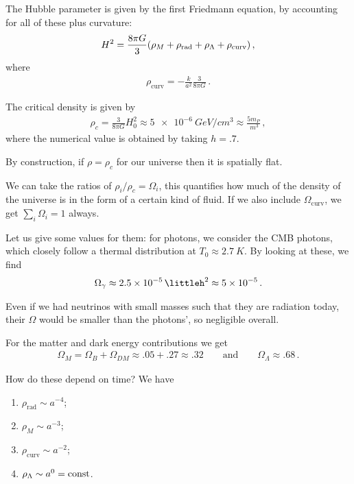 \documentclass[main.tex]{subfiles}
\begin{document}
The Hubble parameter is given by the first Friedmann equation, by accounting for all of these plus curvature:
%
\begin{align}
H^2 = \frac{8 \pi G}{3} \qty(\rho_{M} + \rho _{\text{rad}} + \rho_{\Lambda } + \rho _{\text{curv}})
\,,
\end{align}
%
where 
%
\begin{align}
\rho _{\text{curv}} = - \frac{k}{a^2} \frac{3}{8 \pi G}
\,.
\end{align}

The critical density is given by 
%
\begin{align}
\rho_{c} = \frac{3}{8 \pi G} H_0^2 \approx \SI{5e-6}{GeV / cm^3} \approx \frac{5 m_P}{\SI{}{m^3}}
\,,
\end{align}
%
where the numerical value is obtained by taking \(h = \num{.7}\). 

By construction, if \(\rho = \rho_{c}\) for our universe then it is spatially flat.

We can take the ratios of \(\rho_{i} / \rho_{c} = \Omega_{i}\), this quantifies how much of the density of the universe is in the form of a certain kind of fluid. 
If we also include \(\Omega _{\text{curv}}\), we get \(\sum _{i} \Omega_{i} = 1\) always. 

Let us give some values for them: for photons, we consider the CMB photons, which closely follow a thermal distribution at \(T_0 \approx \SI{2.7}{K}\). By looking at these, we find 
%
\begin{align}
\Omega_{\gamma } \approx \SI{2.5e-5}{\littleh^2} \approx \num{5e-5}
\,.
\end{align}


Even if we had neutrinos with small masses such that they are radiation today, their \(\Omega \) would be smaller than the photons', so negligible overall. 

For the matter and dark energy contributions we get 
%
\begin{align}
\Omega_{M} = \Omega_{B} + \Omega_{DM} \approx \num{.05} + \num{.27} \approx \num{.32}
\qquad \text{and} \qquad
\Omega_{\Lambda } \approx \num{.68}
\,.
\end{align}

How do these depend on time? We have 
\begin{enumerate}
    \item \(\rho _{\text{rad}} \sim a^{-4}\);
    \item \(\rho _M \sim a^{-3}\);
    \item \(\rho _{\text{curv}} \sim a^{-2}\);
    \item \(\rho _\Lambda  \sim a^{0} = \text{const}\).
\end{enumerate}
\end{document}
